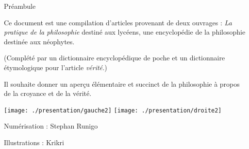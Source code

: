 
\thispagestyle{empty}

\begin{center}
\Large
Préambule
\normalsize
\end{center}
\vspace{3cm}

Ce document est une compilation d'articles provenant de deux
ouvrages : {\it La pratique de la philosophie} destiné aux
lycéens, une encyclopédie de la philosophie destinée aux néophytes.

(Complété par un dictionnaire encyclopédique de poche et un
dictionnaire étymologique pour l'article {\it vérité.})

Il souhaite donner un aperçu élémentaire et succinct de la
philosophie à propos de la croyance et de la vérité.

\vfill

\begin{center}
\texttt{[image: ./presentation/gauche2]}
\hspace{1cm}
\texttt{[image: ./presentation/droite2]}
\end{center}


\vfill

\hfill Numérisation : Stephan Runigo

\hfill Illustrations : Krikri

